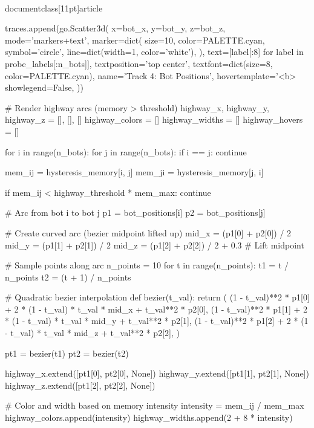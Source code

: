 \\documentclass[11pt]{article}
\begin{document}
\begin{CodeBlock}
{{    traces.append(go.Scatter3d(
        x=bot_x, y=bot_y, z=bot_z,
        mode='markers+text',
        marker=dict(
            size=10,
            color=PALETTE.cyan,
            symbol='circle',
            line=dict(width=1, color='white'),
        ),
        text=[label[:8] for label in probe_labels[:n_bots]],
        textposition='top center',
        textfont=dict(size=8, color=PALETTE.cyan),
        name='Track 4: Bot Positions',
        hovertemplate='<b>%
        showlegend=False,
    ))

    # Render highway arcs (memory > threshold)
    highway_x, highway_y, highway_z = [], [], []
    highway_colors = []
    highway_widths = []
    highway_hovers = []

    for i in range(n_bots):
        for j in range(n_bots):
            if i == j:
                continue

            mem_ij = hysteresis_memory[i, j]
            mem_ji = hysteresis_memory[j, i]

            if mem_ij < highway_threshold * mem_max:
                continue

            # Arc from bot i to bot j
            p1 = bot_positions[i]
            p2 = bot_positions[j]

            # Create curved arc (bezier midpoint lifted up)
            mid_x = (p1[0] + p2[0]) / 2
            mid_y = (p1[1] + p2[1]) / 2
            mid_z = (p1[2] + p2[2]) / 2 + 0.3  # Lift midpoint

            # Sample points along arc
            n_points = 10
            for t in range(n_points):
                t1 = t / n_points
                t2 = (t + 1) / n_points

                # Quadratic bezier interpolation
                def bezier(t_val):
                    return (
                        (1 - t_val)**2 * p1[0] + 2 * (1 - t_val) * t_val * mid_x + t_val**2 * p2[0],
                        (1 - t_val)**2 * p1[1] + 2 * (1 - t_val) * t_val * mid_y + t_val**2 * p2[1],
                        (1 - t_val)**2 * p1[2] + 2 * (1 - t_val) * t_val * mid_z + t_val**2 * p2[2],
                    )

                pt1 = bezier(t1)
                pt2 = bezier(t2)

                highway_x.extend([pt1[0], pt2[0], None])
                highway_y.extend([pt1[1], pt2[1], None])
                highway_z.extend([pt1[2], pt2[2], None])

            # Color and width based on memory intensity
            intensity = mem_ij / mem_max
            highway_colors.append(intensity)
            highway_widths.append(2 + 8 * intensity)

}}
\end{CodeBlock}
\end{document}
